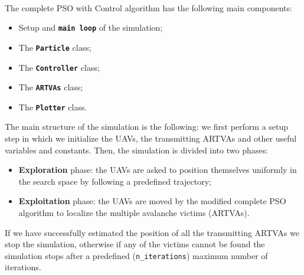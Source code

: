 \documentclass[main]{subfiles}
\begin{document}
\noindent\\
The complete PSO with Control algorithm has the following main components: 
\begin{itemize}
    \item Setup and \textbf{\texttt{main loop}} of the simulation;
    \item The \textbf{\texttt{Particle}} class;
    \item The \textbf{\texttt{Controller}} class;
    \item The \textbf{\texttt{ARTVAs}} class;
    \item The \textbf{\texttt{Plotter}} class.
\end{itemize}
The main structure of the simulation is the following: 
we first perform a setup step in which we initialize the UAVs, 
the transmitting ARTVAs and other useful variables and constants.
Then, the simulation is divided into two phases:
\begin{itemize}
    \item \textbf{Exploration} phase: the UAVs are asked to position 
 themselves uniformly in the search space by following a
 predefined trajectory;
    \item \textbf{Exploitation} phase: the UAVs are moved by the modified complete
 PSO algorithm to localize the multiple avalanche victims (ARTVAs).
\end{itemize}
If we have successfully estimated the position of all 
the transmitting ARTVAs we stop the simulation, otherwise if any of the 
victims cannot be found the simulation stops after
a predefined (\texttt{n\_iterations}) maximum number of iterations.
\end{document}
